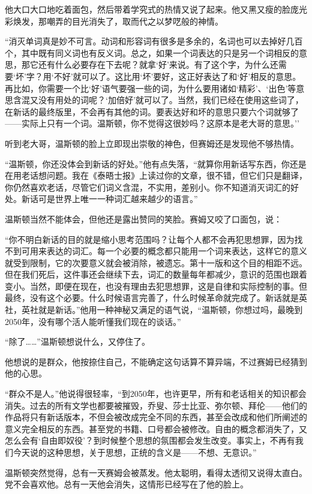他大口大口地吃着面包，然后带着学究式的热情又说了起来。他又黑又瘦的脸庞光彩焕发，那嘲弄的目光消失了，取而代之以梦呓般的神情。

``消灭单词真是妙不可言。动词和形容词有很多是多余的，名词也可以去掉好几百个，其中既有同义词也有反义词。总之，如果一个词表达的只是另一个词相反的意思，那它还有什么必要存在下去呢？就拿`好'来说。有了这个字，为什么还需要`坏'字？用`不好'就可以了。这比用`坏'要好，这正好表达了和`好'相反的意思。再比如，你需要一个比`好'语气要强一些的词，为什么要用诸如`精彩'、`出色'等意思含混又没有用处的词呢？`加倍好'就可以了。当然，我们已经在使用这些词了，在新话的最终版里，不会再有其他的词。要表达好和坏的意思只要六个词就够了——实际上只有一个词。温斯顿，你不觉得这很妙吗？这原本是老大哥的意思。''

听到老大哥，温斯顿的脸上立即现出崇敬的神色，但赛姆还是发现他不够热情。

``温斯顿，你还没体会到新话的好处。''他有点失落，``就算你用新话写东西，你还是在用老话想问题。我在《泰晤士报》上读过你的文章，很不错，但它们只是翻译，你仍然喜欢老话，尽管它们词义含混，不实用，差别小。你不知道消灭词汇的好处。新话可是世界上唯一一种词汇越来越少的语言。''

温斯顿当然不能体会，但他还是露出赞同的笑脸。赛姆又咬了口面包，说：

``你不明白新话的目的就是缩小思考范围吗？让每个人都不会再犯思想罪，因为找不到可用来表达的词汇。每一个必要的概念都只能用一个词来表达，这样它的意义就受到限制，它的次要意义就会被消除，被遗忘。第十一版和这个目的相距不远。但在我们死后，这件事还会继续下去，词汇的数量每年都减少，意识的范围也跟着变小。当然，即便在现在，也没有理由去犯思想罪，这是自律和实际控制的事。但最终，没有这个必要。什么时候语言完善了，什么时候革命就完成了。新话就是英社，英社就是新话。''他用一种神秘又满足的语气说，``温斯顿，你想过吗，最晚到2050年，没有哪个活人能听懂我们现在的谈话。''

``除了\ldots\ldots''温斯顿想说什么，又停住了。

他想说的是群众，他按捺住自己，不能确定这句话算不算异端，不过赛姆已经猜到他的心思。

``群众不是人。''他说得很轻率，``到2050年，也许更早，所有和老话相关的知识都会消失。过去的所有文学也都要被摧毁，乔叟、莎士比亚、弥尔顿、拜伦——他们的作品将只有新话版本，不但会被改成完全不同的东西，甚至会改成和他们所阐述的意义完全相反的东西。甚至党的书籍、口号都会被修改。自由的概念都消失了，又怎么会有`自由即奴役'？到时候整个思想的氛围都会发生改变。事实上，不再有我们今天说的这种思想，关于思想，正统的含义是——不想、无意识。''

温斯顿突然觉得，总有一天赛姆会被蒸发。他太聪明，看得太透彻又说得太直白。党不会喜欢他。总有一天他会消失，这情形已经写在了他的脸上。

